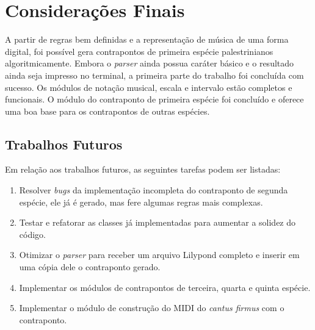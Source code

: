 \chapter[Considerações Finais]{Considerações Finais} \label{c4}

  A partir de regras bem definidas e a representação de música de uma forma digital, foi possível gera contrapontos de primeira espécie palestrinianos algoritmicamente. Embora o \textit{parser} ainda possua caráter básico e o resultado ainda seja impresso no terminal, a primeira parte do trabalho foi concluída com sucesso. Os módulos de notação musical, escala e intervalo estão completos e funcionais. O módulo do contraponto de primeira espécie foi concluído e oferece uma boa base para os contrapontos de outras espécies.

  \section[Trabalhos Futuros]{Trabalhos Futuros}

    Em relação aos trabalhos futuros, as seguintes tarefas podem ser listadas:

    \begin{enumerate}
      \item Resolver \textit{bugs} da implementação incompleta do contraponto de segunda espécie, ele já é gerado, mas fere algumas regras mais complexas.
      \item Testar e refatorar as classes já implementadas para aumentar a solidez do código.
      \item Otimizar o \textit{parser} para receber um arquivo Lilypond completo e inserir em uma cópia dele o contraponto gerado.
      \item Implementar os módulos de contrapontos de terceira, quarta e quinta espécie.
      \item Implementar o módulo de construção do MIDI do \textit{cantus firmus} com o contraponto.
    \end{enumerate}
